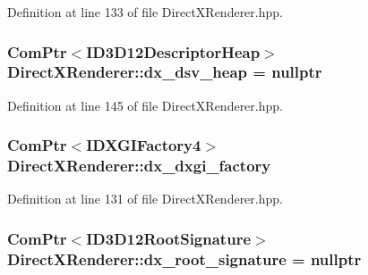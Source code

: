 Definition at line 133 of file Direct\+X\+Renderer.\+hpp.

\subsubsection[{\texorpdfstring{dx\+\_\+dsv\+\_\+heap}{dx_dsv_heap}}]{\setlength{\rightskip}{0pt plus 5cm}Com\+Ptr$<$I\+D3\+D12\+Descriptor\+Heap$>$ Direct\+X\+Renderer\+::dx\+\_\+dsv\+\_\+heap = nullptr\hspace{0.3cm}{\ttfamily [protected]}}\hypertarget{class_direct_x_renderer_ae865e29f2c2084f98b095b8b60fbeef2_ae865e29f2c2084f98b095b8b60fbeef2}{}\label{class_direct_x_renderer_ae865e29f2c2084f98b095b8b60fbeef2_ae865e29f2c2084f98b095b8b60fbeef2}


Definition at line 145 of file Direct\+X\+Renderer.\+hpp.

\subsubsection[{\texorpdfstring{dx\+\_\+dxgi\+\_\+factory}{dx_dxgi_factory}}]{\setlength{\rightskip}{0pt plus 5cm}Com\+Ptr$<$I\+D\+X\+G\+I\+Factory4$>$ Direct\+X\+Renderer\+::dx\+\_\+dxgi\+\_\+factory\hspace{0.3cm}{\ttfamily [protected]}}\hypertarget{class_direct_x_renderer_a514dd6a49f675b0b1f05eeb5df61e688_a514dd6a49f675b0b1f05eeb5df61e688}{}\label{class_direct_x_renderer_a514dd6a49f675b0b1f05eeb5df61e688_a514dd6a49f675b0b1f05eeb5df61e688}


Definition at line 131 of file Direct\+X\+Renderer.\+hpp.

\subsubsection[{\texorpdfstring{dx\+\_\+root\+\_\+signature}{dx_root_signature}}]{\setlength{\rightskip}{0pt plus 5cm}Com\+Ptr$<$I\+D3\+D12\+Root\+Signature$>$ Direct\+X\+Renderer\+::dx\+\_\+root\+\_\+signature = nullptr\hspace{0.3cm}{\ttfamily [protected]}}\hypertarget{class_direct_x_renderer_a36476b689f10a35b756e083320a13634_a36476b689f10a35b756e083320a13634}{}\label{class_direct_x_renderer_a36476b689f10a35b756e083320a13634_a36476b689f10a35b756e083320a13634}


